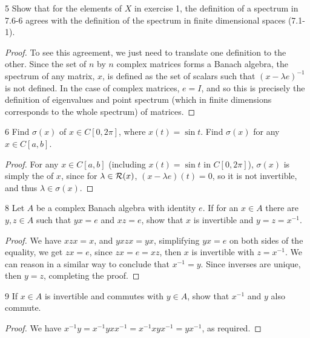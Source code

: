 \begin{exercise}{5}
Show that for the elements of $X$ in exercise 1, the definition of a spectrum in 7.6-6 agrees with the definition of the spectrum in finite dimensional spaces (7.1-1).
\end{exercise}
\begin{proof}
To see this agreement, we just need to translate one definition to the other.
Since the set of $n$ by $n$ complex matrices forms a Banach algebra, the spectrum of any matrix, $x$, is defined as the set of scalars such that $(x - \lambda e)^{-1}$ is not defined.
In the case of complex matrices, $e = I$, and so this is precisely the definition of eigenvalues and point spectrum (which in finite dimensions corresponds to the whole spectrum) of matrices.
\end{proof} 

\begin{exercise}{6}
Find $\sigma(x)$ of $x \in C[0, 2\pi]$, where $x(t) = \sin t$.
Find $\sigma(x)$ for any $x \in C[a,b]$.
\end{exercise}
\begin{proof}
For any $x \in C[a,b]$ (including $x(t) = \sin t$ in $C[0,2\pi]$), $\sigma(x)$ is simply the of $x$, since for $\lambda \in \mathcal{R}(x)$, $(x - \lambda e)(t) = 0$, so it is not invertible, and thus $\lambda \in \sigma(x)$.
\end{proof} 

\begin{exercise}{8}
Let $A$ be a complex Banach algebra with identity $e$.
If for an $x \in A$ there are $y, z \in A$ such that $yx = e$ and $xz = e$, show that $x$ is invertible and $y = z = x^{-1}$.
\end{exercise}
\begin{proof}
We have $x z x = x$, and $y x z x = y x$, simplifying $yx = e$ on both sides of the equality, we get $z x = e$, since $z x = e = x z$, then $x$ is invertible with $z = x^{-1}$.
We can reason in a similar way to conclude that $x^{-1} = y$.
Since inverses are unique, then $y = z$, completing the proof.
\end{proof} 

\begin{exercise}{9}
If $x \in A$ is invertible and commutes with $y \in A$, show that $x^{-1}$ and $y$ also commute.
\end{exercise}
\begin{proof}
We have $x^{-1} y = x^{-1} y x x^{-1} = x^{-1} x y x^{-1} = y x^{-1}$, as required.
\end{proof} 
